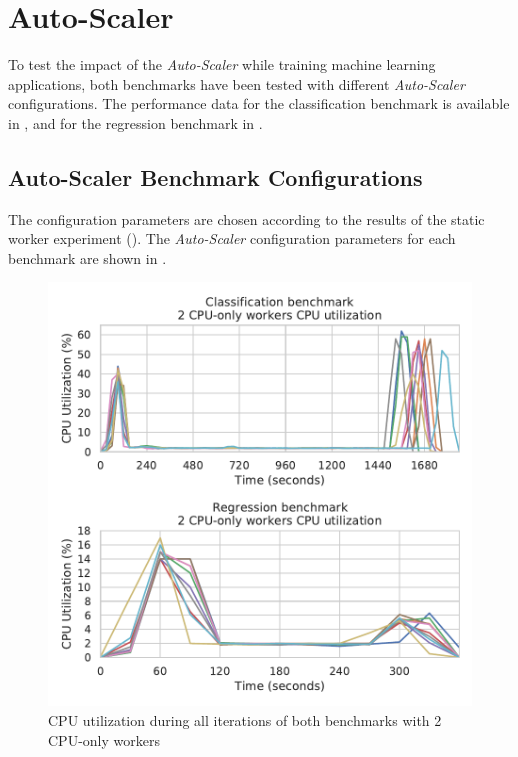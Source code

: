 \section{Auto-Scaler}
\label{sec:07_auto-scaler}
To test the impact of the \textit{Auto-Scaler} while training machine learning applications, both benchmarks have been tested with different \textit{Auto-Scaler} configurations.
The performance data for the classification benchmark is available in , and for the regression benchmark in .


\subsection{Auto-Scaler Benchmark Configurations}
The configuration parameters are chosen according to the results of the static worker experiment ().
The \textit{Auto-Scaler} configuration parameters for each benchmark are shown in .
\begin{figure}[h]
\centering
\includegraphics[scale=0.9]{images/07_evaluation/overall_auto-scaler_iterations}
\caption{CPU utilization during all iterations of both benchmarks with 2 CPU-only workers}
\label{fig:07_auto-scaler_iterations_results}
\end{figure}

